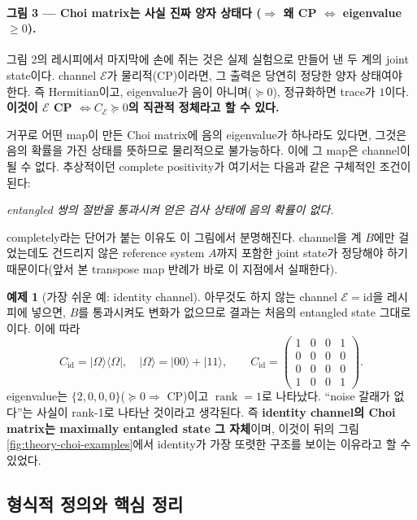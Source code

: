 \documentclass[11pt,a4paper]{article}
\newcommand{\E}{\mathcal{E}}
\newcommand{\id}{\mathrm{id}}
\newcommand{\rank}{\operatorname{rank}}
\theoremstyle{definition}
\newtheorem{example}{예제}[section]
\theoremstyle{plain}
\theoremstyle{remark}
\begin{document}
\paragraph{그림 3 --- Choi matrix는 사실 진짜 양자 상태다 ($\Rightarrow$ 왜 CP $\iff$ eigenvalue $\ge0$).}
그림 2의 레시피에서 마지막에 손에 쥐는 것은 실제 실험으로 만들어 낸 두 계의 joint state이다. channel $\E$가 물리적(CP)이라면, 그 출력은 당연히 정당한 양자 상태여야 한다. 즉 Hermitian이고, eigenvalue가 음이 아니며($\succeq0$), 정규화하면 trace가 $1$이다. \textbf{이것이 $\E$ CP $\iff C_\E\succeq0$의 직관적 정체라고 할 수 있다.}

거꾸로 어떤 map이 만든 Choi matrix에 음의 eigenvalue가 하나라도 있다면, 그것은 음의 확률을 가진 상태를 뜻하므로 물리적으로 불가능하다. 이에 그 map은 channel이 될 수 없다. 추상적이던 complete positivity가 여기서는 다음과 같은 구체적인 조건이 된다:
\begin{center}
\emph{entangled 쌍의 절반을 통과시켜 얻은 검사 상태에 음의 확률이 없다.}
\end{center}
completely라는 단어가 붙는 이유도 이 그림에서 분명해진다. channel을 계 $B$에만 걸었는데도 건드리지 않은 reference system $A$까지 포함한 joint state가 정당해야 하기 때문이다(앞서 본 transpose map 반례가 바로 이 지점에서 실패한다).

\begin{example}[가장 쉬운 예: identity channel]\label{ex:idchoi}
아무것도 하지 않는 channel $\E=\id$을 레시피에 넣으면, $B$를 통과시켜도 변화가 없으므로 결과는 처음의 entangled state 그대로이다. 이에 따라
\[
C_{\id}=|\Omega\rangle\langle\Omega|,\quad |\Omega\rangle=|00\rangle+|11\rangle,
\qquad
C_{\id}=\begin{pmatrix}1&0&0&1\\0&0&0&0\\0&0&0&0\\1&0&0&1\end{pmatrix}.
\]
eigenvalue는 $\{2,0,0,0\}$($\succeq0\Rightarrow$ CP)이고 $\rank=1$로 나타났다. ``noise 갈래가 없다''는 사실이 rank-1로 나타난 것이라고 생각된다. 즉 \textbf{identity channel의 Choi matrix는 maximally entangled state 그 자체}이며, 이것이 뒤의 그림 \ref{fig:theory-choi-examples}에서 identity가 가장 또렷한 구조를 보이는 이유라고 할 수 있었다.
\end{example}

\subsection{형식적 정의와 핵심 정리}
\end{document}

